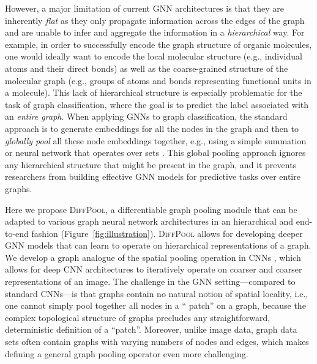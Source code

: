 \documentclass{article}
\newcommand{\name}{\textsc{DiffPool}\xspace}
\begin{document}
However, a major limitation of current GNN architectures is that they are inherently {\em flat} as they only propagate information across the edges of the graph and are unable to infer and aggregate the information in a \textit{hierarchical} way. 
For example, in order to successfully encode the graph structure of organic molecules, one would ideally want to encode the local molecular structure (e.g., individual atoms and their direct bonds) as well as the coarse-grained structure of the molecular graph (e.g., groups of atoms and bonds representing functional units in a molecule).
This lack of hierarchical structure is especially problematic for the task of graph classification, where the goal is to predict the label associated with an \textit{entire graph}. When applying GNNs to graph classification, the standard approach is to generate embeddings for all the nodes in the graph and then to {\em globally pool} all these node embeddings together, e.g., using a simple summation or neural network that operates over sets \cite{dai2016discriminative,Duv+2015,Gil+2017,Li+2016}. This global pooling approach ignores any hierarchical structure that might be present in the graph, and it prevents researchers from building effective GNN models for predictive tasks over entire graphs.







Here we propose \name, a differentiable graph pooling module that can be adapted to various graph neural network architectures in an hierarchical and end-to-end fashion (Figure~\ref{fig:illustration}). 
\name allows for developing deeper GNN models that can learn to operate on hierarchical representations of a graph. We develop a graph analogue of the spatial pooling operation in CNNs \cite{krizhevsky2012imagenet}, which allows for deep CNN architectures to iteratively operate on coarser and coarser representations of an image. The challenge in the GNN setting---compared to standard CNNs---is that graphs contain no natural notion of spatial locality, i.e., one cannot simply pool together all nodes in a `` patch'' on a graph, because the complex topological structure of graphs precludes any straightforward, deterministic definition of a ``patch''. Moreover, unlike image data, graph data sets often contain graphs with varying numbers of nodes and edges, which makes defining a general graph pooling operator even more challenging.
\end{document}
